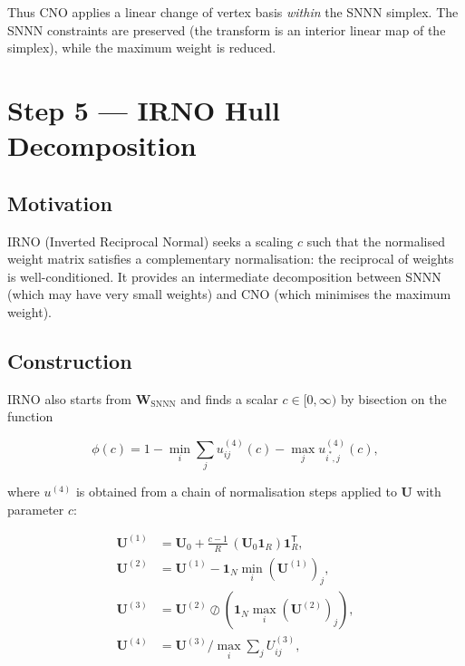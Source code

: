 \documentclass[11pt]{article}
\theoremstyle{definition}
\theoremstyle{plain}
\newcommand{\mat}[1]{\mathbf{#1}}
\newcommand{\ones}{\mathbf{1}}
\newcommand{\T}{\mathsf{T}}
\begin{document}
Thus CNO applies a linear change of vertex basis \emph{within} the SNNN
simplex.  The SNNN constraints are preserved (the transform is an
interior linear map of the simplex), while the maximum weight is reduced.


\section{Step 5 --- IRNO Hull Decomposition}

\subsection{Motivation}

IRNO (Inverted Reciprocal Normal) seeks a scaling $c$ such that the
normalised weight matrix satisfies a complementary normalisation: the
reciprocal of weights is well-conditioned.  It provides an intermediate
decomposition between SNNN (which may have very small weights) and CNO
(which minimises the maximum weight).

\subsection{Construction}

IRNO also starts from $\mat{W}_{\mathrm{SNNN}}$ and finds a scalar
$c \in [0, \infty)$ by bisection on the function

\begin{equation}
  \phi(c) = 1 - \min_i \sum_j u_{ij}^{(4)}(c)
            - \max_j u_{i^*,j}^{(4)}(c),
  \label{eq:rno_diff}
\end{equation}

where $u^{(4)}$ is obtained from a chain of normalisation steps applied
to $\mat{U}$ with parameter $c$:

\begin{align}
  \mat{U}^{(1)} &= \mat{U}_0 + \frac{c-1}{R}\,(\mat{U}_0\ones_R)\ones_R^\T,
  \label{eq:irno1}\\
  \mat{U}^{(2)} &= \mat{U}^{(1)} - \ones_N\min_i(\mat{U}^{(1)})_j,
  \label{eq:irno2}\\
  \mat{U}^{(3)} &= \mat{U}^{(2)} \oslash (\ones_N\max_i(\mat{U}^{(2)})_j),
  \label{eq:irno3}\\
  \mat{U}^{(4)} &= \mat{U}^{(3)}\big/\max_i\sum_j U^{(3)}_{ij},
  \label{eq:irno4}
\end{align}
\end{document}
